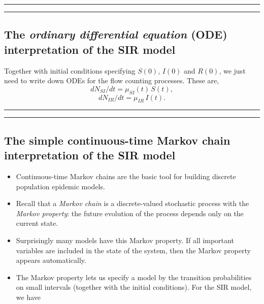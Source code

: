 \documentclass[]{article}
\begin{document}
\begin{center}\rule{0.5\linewidth}{\linethickness}\end{center}

\begin{center}\rule{0.5\linewidth}{\linethickness}\end{center}

\subsection{\texorpdfstring{The \emph{ordinary differential equation}
(ODE) interpretation of the SIR
model}{The ordinary differential equation (ODE) interpretation of the SIR model}}\label{the-ordinary-differential-equation-ode-interpretation-of-the-sir-model}

Together with initial conditions specifying \(S(0)\), \(I(0)\) and
\(R(0)\), we just need to write down ODEs for the flow counting
processes. These are, \[ dN_{SI}/dt = \mu_{SI}(t) \, S(t),\]
\[ dN_{IR}/dt = \mu_{IR}\, I(t).\]

\begin{center}\rule{0.5\linewidth}{\linethickness}\end{center}

\begin{center}\rule{0.5\linewidth}{\linethickness}\end{center}

\subsection{The simple continuous-time Markov chain interpretation of
the SIR
model}\label{the-simple-continuous-time-markov-chain-interpretation-of-the-sir-model}

\begin{itemize}
\item
  Continuous-time Markov chains are the basic tool for building discrete
  population epidemic models.
\item
  Recall that a \emph{Markov chain} is a discrete-valued stochastic
  process with the \emph{Markov property}: the future evolution of the
  process depends only on the current state.
\item
  Surprisingly many models have this Markov property. If all important
  variables are included in the state of the system, then the Markov
  property appears automatically.
\item
  The Markov property lets us specify a model by the transition
  probabilities on small intervals (together with the initial
  conditions). For the SIR model, we have
\end{itemize}
\end{document}
